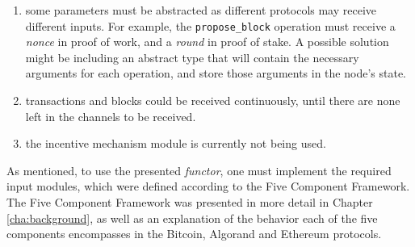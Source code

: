 \begin{enumerate}
    \item some parameters must be abstracted as different protocols may receive different inputs. For example, the \texttt{propose\_block} operation must receive a \textit{nonce} in proof of work, and a \textit{round} in proof of stake. A possible solution might be including an abstract type that will contain the necessary arguments for each operation, and store those arguments in the node's state.
    \item transactions and blocks could be received continuously, until there are none left in the channels to be received.
    \item the incentive mechanism module is currently not being used.
\end{enumerate}



\vspace{0.2cm}

As mentioned, to use the presented \textit{functor}, one must implement the required input modules, which were defined according to the Five Component Framework. The Five Component Framework was presented in more detail in Chapter \ref{cha:background}, as well as an explanation of the behavior each of the five components encompasses in the Bitcoin, Algorand and Ethereum protocols.

